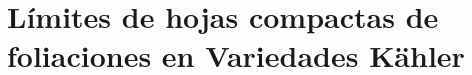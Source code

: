 \documentclass[letterpaper]{beamer}
\newcommand{\co}{\ensuremath{\mathbb C }}
\newcommand{\con}{\ensuremath{\mathbb{C}^n}}
\begin{document}

\section{L\'imites de hojas compactas de foliaciones en Variedades K\"ahler}
\end{document}
